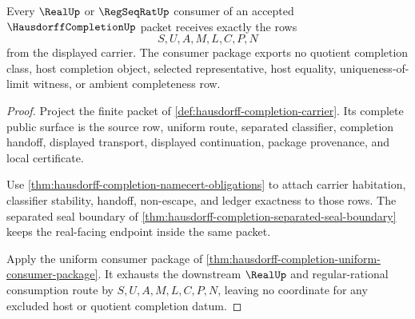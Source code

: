 \begin{theorem}
\label{thm:hausdorffcompletion-real-regseq-consumer-package}
Every $\RealUp$ or $\RegSeqRatUp$ consumer of an accepted $\HausdorffCompletionUp$ packet receives exactly the rows
$$
S,U,A,M,L,C,P,N
$$
from the displayed carrier. The consumer package exports no quotient completion class, host completion object, selected representative, host equality, uniqueness-of-limit witness, or ambient completeness row.
\end{theorem}
\begin{proof}
Project the finite packet of \autoref{def:hausdorff-completion-carrier}. Its complete public surface is the source row, uniform route, separated classifier, completion handoff, displayed transport, displayed continuation, package provenance, and local certificate.

Use \autoref{thm:hausdorff-completion-namecert-obligations} to attach carrier habitation, classifier stability, handoff, non-escape, and ledger exactness to those rows. The separated seal boundary of \autoref{thm:hausdorff-completion-separated-seal-boundary} keeps the real-facing endpoint inside the same packet.

Apply the uniform consumer package of \autoref{thm:hausdorff-completion-uniform-consumer-package}. It exhausts the downstream $\RealUp$ and regular-rational consumption route by $S,U,A,M,L,C,P,N$, leaving no coordinate for any excluded host or quotient completion datum.
\end{proof}

